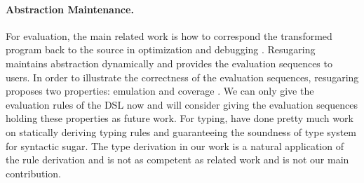 \paragraph{Abstraction Maintenance.}
For evaluation, the main related work is how to correspond the transformed program back to the source in optimization and debugging \cite{resugar,abs-1,abs-2,abs-3}.
Resugaring maintains abstraction dynamically and provides the evaluation sequences to users.
In order to illustrate the correctness of the evaluation sequences, resugaring proposes two properties: emulation and coverage \cite{resugar}.
We can only give the evaluation rules of the DSL now and 
 will consider giving the evaluation sequences holding these properties as future work.
For typing, \cite{infer-types,type-sound,type-sound-1} have done pretty much work on statically deriving typing rules and guaranteeing the soundness of type system for syntactic sugar.
The type derivation in our work is a natural application of the rule derivation
 and is not as competent as related work and is not our main contribution.
